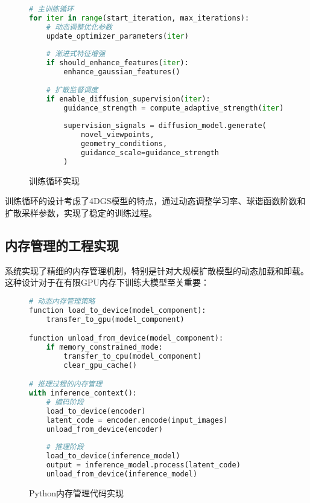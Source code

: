 \begin{figure}[!b]
  \begin{tmpbox}
    \begin{lstlisting}[language=Python]
# 主训练循环
for iter in range(start_iteration, max_iterations):
    # 动态调整优化参数
    update_optimizer_parameters(iter)
    
    # 渐进式特征增强
    if should_enhance_features(iter):
        enhance_gaussian_features()
    
    # 扩散监督调度
    if enable_diffusion_supervision(iter):
        guidance_strength = compute_adaptive_strength(iter)
        
        supervision_signals = diffusion_model.generate(
            novel_viewpoints, 
            geometry_conditions,
            guidance_scale=guidance_strength
        )
\end{lstlisting}
  \end{tmpbox}
  \caption{训练循环实现}
  \label{fig:train-loop-code}
\end{figure}

训练循环的设计考虑了4DGS模型的特点，通过动态调整学习率、球谐函数阶数和扩散采样参数，实现了稳定的训练过程。

\subsection{内存管理的工程实现}

系统实现了精细的内存管理机制，特别是针对大规模扩散模型的动态加载和卸载。这种设计对于在有限GPU内存下训练大模型至关重要：

\begin{figure}[!b]
  \begin{tmpbox}
    \begin{lstlisting}[language=Python]
# 动态内存管理策略
function load_to_device(model_component):
    transfer_to_gpu(model_component)

function unload_from_device(model_component):
    if memory_constrained_mode:
        transfer_to_cpu(model_component)
        clear_gpu_cache()

# 推理过程的内存管理
with inference_context():
    # 编码阶段
    load_to_device(encoder)
    latent_code = encoder.encode(input_images)
    unload_from_device(encoder)
    
    # 推理阶段
    load_to_device(inference_model)
    output = inference_model.process(latent_code)
    unload_from_device(inference_model)
\end{lstlisting}
  \end{tmpbox}
  \caption{Python内存管理代码实现}
  \label{fig:python-memory}
\end{figure}


